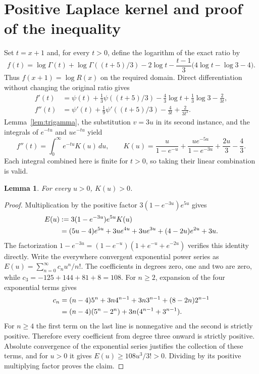 \documentclass[11pt]{article}
\newtheorem{lemma}[theorem]{Lemma}
\begin{document}
\section{Positive Laplace kernel and proof of the inequality}
\label{sec:kernel}
Set $t=x+1$ and, for every $t>0$, define the logarithm of the exact
ratio by
\begin{equation}\label{eq:f}
f(t)=\log\Gamma(t)+\log\Gamma((t+5)/3)-2\log t
-\frac{t-1}{3}\bigl(4\log t-\log3-4\bigr).
\end{equation}
Thus $f(x+1)=\log R(x)$ on the required domain. Direct differentiation
without changing the original ratio gives
\begin{align}
f'(t)&=\psi(t)+\tfrac13\psi((t+5)/3)
-\tfrac43\log t+\tfrac13\log3-\tfrac2{3t},\label{eq:fp}\\
f''(t)&=\psi'(t)+\tfrac19\psi'((t+5)/3)
-\tfrac4{3t}+\tfrac2{3t^2}.\label{eq:fpp}
\end{align}
Lemma~\ref{lem:trigamma}, the substitution $v=3u$ in its second
instance, and the integrals of $e^{-tu}$ and $u e^{-tu}$ yield
\begin{equation}\label{eq:kernel}
f''(t)=\int_0^\infty e^{-tu}K(u)\,du,\qquad
K(u)=\frac{u}{1-e^{-u}}+
\frac{u e^{-5u}}{1-e^{-3u}}+\frac{2u}{3}-\frac43.
\end{equation}
Each integral combined here is finite for $t>0$, so taking their
linear combination is valid.

\begin{lemma}\label{lem:kernel-positive}
For every $u>0$, $K(u)>0$.
\end{lemma}
\begin{proof}
Multiplication by the positive factor $3(1-e^{-3u})e^{5u}$ gives
\begin{align}
E(u)&:=3(1-e^{-3u})e^{5u}K(u)\notag\\
&=(5u-4)e^{5u}+3u e^{4u}+3u e^{3u}
+(4-2u)e^{2u}+3u.\label{eq:E}
\end{align}
The factorization $1-e^{-3u}=(1-e^{-u})(1+e^{-u}+e^{-2u})$
verifies this identity directly. Write the everywhere convergent
exponential power series as $E(u)=\sum_{n=0}^\infty c_nu^n/n!$.
The coefficients in degrees zero, one and two are zero, while
$c_3=-125+144+81+8=108$. For $n\ge2$, expansion of the four
exponential terms gives
\begin{align}
c_n&=(n-4)5^n+3n4^{n-1}+3n3^{n-1}
+(8-2n)2^{n-1}\notag\\
&=(n-4)(5^n-2^n)+3n(4^{n-1}+3^{n-1}).\label{eq:coefficients}
\end{align}
For $n\ge4$ the first term on the last line is nonnegative and
the second is strictly positive. Therefore every coefficient from
degree three onward is strictly positive. Absolute convergence of
the exponential series justifies the collection of these terms,
and for $u>0$ it gives $E(u)\ge108u^3/3!>0$.
Dividing by its positive multiplying factor proves the claim.
\end{proof}
\end{document}
